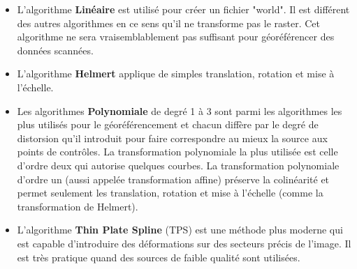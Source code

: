 \begin{itemize}[label=--]
\item L'algorithme \textbf{Linéaire} est utilisé pour créer un fichier "world". Il est différent des autres algorithmes en ce sens qu'il ne transforme pas le raster. Cet algorithme ne sera vraisemblablement pas suffisant pour géoréférencer des données scannées.
\item L'algorithme \textbf{Helmert} applique de simples translation, rotation et mise à l'échelle.
\item Les algorithmes \textbf{Polynomiale} de degré 1 à 3 sont parmi les algorithmes les plus utilisés pour le géoréférencement et chacun diffère par le degré de distorsion qu'il introduit pour faire correspondre au mieux la source aux points de contrôles. La transformation polynomiale la plus utilisée est celle d'ordre deux qui autorise quelques courbes. La transformation polynomiale d'ordre un (aussi appelée transformation affine) préserve la colinéarité et permet seulement les translation, rotation et mise à l'échelle (comme la transformation de Helmert).
\item L'algorithme \textbf{Thin Plate Spline} (TPS) est une méthode plus moderne qui est capable d'introduire des déformations sur des secteurs précis de l'image. Il est très pratique quand des sources de faible qualité sont utilisées.
\end{itemize}


